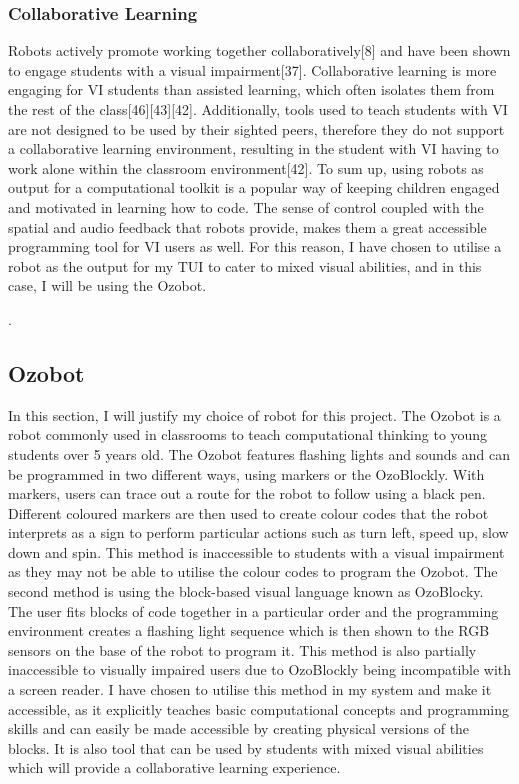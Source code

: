\documentclass[oneside,%
                    author={Malak Hajji},
                    degree={BSc},
                    title={Designing An Accessible Computational Toolkit For Students},
                  subtitle={With Mixed Visual Abilities}]{dissertation}
\begin{document}
\subsubsection{Collaborative Learning}
Robots actively promote working together collaboratively[8] and have been shown to engage students with a visual impairment[37]. Collaborative learning is more engaging for VI students than assisted learning, which often isolates them from the rest of the class[46][43][42]. Additionally, tools used to teach students with VI are not designed to be used by their sighted peers, therefore they do not support a collaborative learning environment, resulting in the student with VI having to work alone within the classroom environment[42].
\newline
To sum up, using robots as output for a computational toolkit is a popular way of keeping children engaged and motivated in learning how to code. The sense of control coupled with the spatial and audio feedback that robots provide, makes them a great accessible programming tool for VI users as well. For this reason, I have chosen to utilise a robot as the output for my TUI to cater to mixed visual abilities, and in this case, I will be using the Ozobot.

.
\subsection{Ozobot}
In this section, I will justify my choice of robot for this project. The Ozobot is a robot commonly used in classrooms to teach computational thinking to young students over 5 years old. The Ozobot features flashing lights and sounds and can be programmed in two different ways, using markers or the OzoBlockly. 
With markers, users can trace out a route for the robot to follow using a black pen. Different coloured markers are then used to create colour codes that the robot interprets as a sign to perform particular actions such as turn left, speed up, slow down and spin. This method is inaccessible to students with a visual impairment as they may not be able to utilise the colour codes to program the Ozobot. The second method is using the block-based visual language known as OzoBlocky. The user fits blocks of code together in a particular order and the programming environment creates a flashing light sequence which is then shown to the RGB sensors on the base of the robot to program it. This method is also partially inaccessible to visually impaired users due to OzoBlockly being incompatible with a screen reader. I have chosen to utilise this method in my system and make it accessible, as it explicitly teaches basic computational concepts and programming skills and can easily be made accessible by creating physical versions of the blocks. It is also tool that can be used by students with mixed visual abilities which will provide a collaborative learning experience.
\end{document}
